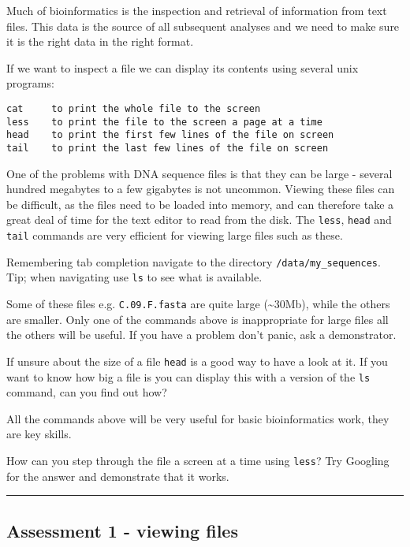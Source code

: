 \documentclass[11pt]{article}
\begin{document}
Much of bioinformatics is the inspection and retrieval of information
from text files. This data is the source of all subsequent analyses and
we need to make sure it is the right data in the right format.

If we want to inspect a file we can display its contents using several
unix programs:

\begin{verbatim}
cat     to print the whole file to the screen
less    to print the file to the screen a page at a time
head    to print the first few lines of the file on screen
tail    to print the last few lines of the file on screen
\end{verbatim}

One of the problems with DNA sequence files is that they can be large -
several hundred megabytes to a few gigabytes is not uncommon. Viewing
these files can be difficult, as the files need to be loaded into
memory, and can therefore take a great deal of time for the text editor
to read from the disk. The \texttt{less}, \texttt{head} and
\texttt{tail} commands are very efficient for viewing large files such
as these.

Remembering tab completion navigate to the directory
\texttt{/data/my\_sequences}. Tip; when navigating use \texttt{ls} to
see what is available.

Some of these files e.g. \texttt{C.09.F.fasta} are quite large
(\textasciitilde{}30Mb), while the others are smaller. Only one of the
commands above is inappropriate for large files all the others will be
useful. If you have a problem don't panic, ask a demonstrator.

If unsure about the size of a file \texttt{head} is a good way to have a
look at it. If you want to know how big a file is you can display this
with a version of the \texttt{ls} command, can you find out how?

All the commands above will be very useful for basic bioinformatics
work, they are key skills.

    How can you step through the file a screen at a time using
\texttt{less}? Try Googling for the answer and demonstrate that it
works.

    \begin{center}\rule{0.5\linewidth}{\linethickness}\end{center}

\hypertarget{assessment-1---viewing-files}{%
\subsection{Assessment 1 - viewing
files}\label{assessment-1---viewing-files}}
\end{document}
